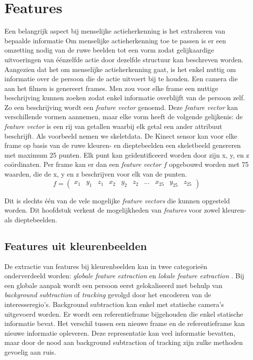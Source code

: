 %

\chapter{Features}
\label{ch:features}
Een belangrijk aspect bij menselijke actieherkenning is het extraheren van bepaalde informatie 
Om menselijke actieherkenning toe te passen is er een omzetting nodig van de ruwe beelden tot een vorm zodat gelijkaardige uitvoeringen van éénzelfde actie door dezelfde structuur kan beschreven worden. Aangezien dat het om menselijke actieherkenning gaat, is het enkel nuttig om informatie over de persoon die de actie uitvoert bij te houden. Een camera die aan het filmen is genereert frames. Men zou voor elke frame een nuttige beschrijving kunnen zoeken zodat enkel informatie overblijft van de persoon zelf. Zo een beschrijving wordt een \textit{feature vector} genoemd. Deze \textit{feature vector} kan verschillende vormen aannemen, maar elke vorm heeft de volgende gelijkenis: de \textit{feature vector} is een rij van getallen waarbij elk getal een ander attribuut beschrijft. Als voorbeeld nemen we skeletdata. De Kinect sensor kan voor elke frame op basis van de ruwe kleuren- en dieptebeelden een skeletbeeld genereren met maximum 25 punten. Elk punt kan geïdentificeerd worden door zijn x, y, en z coördinaten. Per frame kan er dan een \textit{feature vector} $f$ opgebouwd worden met 75 waarden, die de x, y en z beschrijven voor elk van de punten.
$$f =  \begin{pmatrix}
x_1 & y_1&  z_1&  x_2&  y_2&  z_2&  ...&  x_{25} & y_{25}& z_{25}
\end{pmatrix}$$

Dit is slechts één van de vele mogelijke \textit{feature vectors} die kunnen opgesteld worden. Dit hoofdstuk verkent de mogelijkheden van \textit{features} voor zowel kleuren- als dieptebeelden.


\section{Features uit kleurenbeelden}
De extractie van features bij kleurenbeelden kan in twee categorieën onderverdeeld worden: \textit{globale feature extraction} en \textit{lokale feature extraction} \cite{Poppe2010}. Bij een globale aanpak wordt een persoon eerst gelokaliseerd met behulp van \textit{background subtraction} of \textit{tracking} gevolgd door het encoderen van de interesseregio's. Background subtraction kan enkel met statische camera's uitgevoerd worden. Er wordt een referentieframe bijgehouden die enkel statische informatie bevat. Het verschil tussen een nieuwe frame en de referentieframe kan nieuwe informatie opleveren. Deze representatie kan veel informatie bevatten, maar door de nood aan background subtraction of tracking zijn zulke methoden gevoelig aan ruis.

